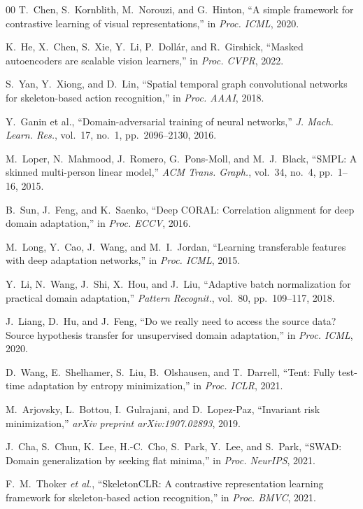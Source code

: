 \documentclass[10pt,journal]{IEEEtran}
\begin{document}
\begin{thebibliography}{00}
T.~Chen, S.~Kornblith, M.~Norouzi, and G.~Hinton,
``A simple framework for contrastive learning of visual representations,''
in \textit{Proc. ICML}, 2020.

K.~He, X.~Chen, S.~Xie, Y.~Li, P.~Doll\'{a}r, and R.~Girshick,
``Masked autoencoders are scalable vision learners,''
in \textit{Proc. CVPR}, 2022.

S.~Yan, Y.~Xiong, and D.~Lin,
``Spatial temporal graph convolutional networks for skeleton-based action recognition,''
in \textit{Proc. AAAI}, 2018.

Y.~Ganin et al.,
``Domain-adversarial training of neural networks,''
\textit{J. Mach. Learn. Res.}, vol.~17, no.~1, pp.~2096--2130, 2016.

M.~Loper, N.~Mahmood, J.~Romero, G.~Pons-Moll, and M.~J.~Black,
``SMPL: A skinned multi-person linear model,''
\textit{ACM Trans. Graph.}, vol.~34, no.~4, pp.~1--16, 2015.

B.~Sun, J.~Feng, and K.~Saenko,
``Deep CORAL: Correlation alignment for deep domain adaptation,''
in \textit{Proc. ECCV}, 2016.

M.~Long, Y.~Cao, J.~Wang, and M.~I.~Jordan,
``Learning transferable features with deep adaptation networks,''
in \textit{Proc. ICML}, 2015.

Y.~Li, N.~Wang, J.~Shi, X.~Hou, and J.~Liu,
``Adaptive batch normalization for practical domain adaptation,''
\textit{Pattern Recognit.}, vol.~80, pp.~109--117, 2018.

J.~Liang, D.~Hu, and J.~Feng,
``Do we really need to access the source data? Source hypothesis transfer for unsupervised domain adaptation,''
in \textit{Proc. ICML}, 2020.

D.~Wang, E.~Shelhamer, S.~Liu, B.~Olshausen, and T.~Darrell,
``Tent: Fully test-time adaptation by entropy minimization,''
in \textit{Proc. ICLR}, 2021.

M.~Arjovsky, L.~Bottou, I.~Gulrajani, and D.~Lopez-Paz,
``Invariant risk minimization,''
\textit{arXiv preprint arXiv:1907.02893}, 2019.

J.~Cha, S.~Chun, K.~Lee, H.-C.~Cho, S.~Park, Y.~Lee, and S.~Park,
``SWAD: Domain generalization by seeking flat minima,''
in \textit{Proc. NeurIPS}, 2021.

F.~M.~Thoker \emph{et al.},
``SkeletonCLR: A contrastive representation learning framework for skeleton-based action recognition,''
in \textit{Proc. BMVC}, 2021.

\end{thebibliography}
\end{document}
